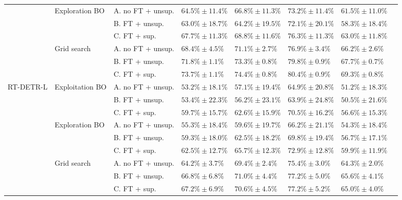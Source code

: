 \begin{table}[H]
\begin{tabular}{llllllll}
    & \multirow{3}{*}{Exploration BO} & A. no FT + unsup. & $64.5\% \pm 11.4\% $ & $66.8\% \pm 11.3\% $ & $73.2\% \pm 11.4\% $ & $61.5\% \pm 11.0\% $ \\ 
    &  & B. FT + unsup. & $63.0\% \pm 18.7\% $ & $64.2\% \pm 19.5\% $ & $72.1\% \pm 20.1\% $ & $58.3\% \pm 18.4\% $ \\ 
    &  & C. FT + sup. & $67.7\% \pm 11.3\% $ & $68.8\% \pm 11.6\% $ & $76.3\% \pm 11.3\% $ & $63.0\% \pm 11.8\% $ \\ 
    \cmidrule{2-7}
    & \multirow{3}{*}{Grid search} & A. no FT + unsup. & $68.4\% \pm 4.5\% $ & $71.1\% \pm 2.7\% $ & $76.9\% \pm 3.4\% $ & $66.2\% \pm 2.6\% $ \\ 
    &  & B. FT + unsup. & $71.8\% \pm 1.1\% $ & $73.3\% \pm 0.8\% $ & $79.8\% \pm 0.9\% $ & $67.7\% \pm 0.7\% $ \\ 
    &  & C. FT + sup. & $73.7\% \pm 1.1\% $ & $74.4\% \pm 0.8\% $ & $80.4\% \pm 0.9\% $ & $69.3\% \pm 0.8\% $ \\ 
    \midrule
    \multirow{9}{*}{RT-DETR-L} & \multirow{3}{*}{Exploitation BO} & A. no FT + unsup. & $53.2\% \pm 18.1\% $ & $57.1\% \pm 19.4\% $ & $64.9\% \pm 20.8\% $ & $51.2\% \pm 18.3\% $ \\ 
    &  & B. FT + unsup. & $53.4\% \pm 22.3\% $ & $56.2\% \pm 23.1\% $ & $63.9\% \pm 24.8\% $ & $50.5\% \pm 21.6\% $ \\ 
    &  & C. FT + sup. & $59.7\% \pm 15.7\% $ & $62.6\% \pm 15.9\% $ & $70.5\% \pm 16.2\% $ & $56.6\% \pm 15.3\% $ \\ 
    \cmidrule{2-7}
    & \multirow{3}{*}{Exploration BO} & A. no FT + unsup. & $55.3\% \pm 18.4\% $ & $59.6\% \pm 19.7\% $ & $66.2\% \pm 21.1\% $ & $54.3\% \pm 18.4\% $ \\ 
    &  & B. FT + unsup. & $59.3\% \pm 18.0\% $ & $62.5\% \pm 18.2\% $ & $69.8\% \pm 19.4\% $ & $56.7\% \pm 17.1\% $ \\ 
    &  & C. FT + sup. & $62.5\% \pm 12.7\% $ & $65.7\% \pm 12.3\% $ & $72.9\% \pm 12.8\% $ & $59.9\% \pm 11.9\% $ \\ 
    \cmidrule{2-7}
    & \multirow{3}{*}{Grid search} & A. no FT + unsup. & $64.2\% \pm 3.7\% $ & $69.4\% \pm 2.4\% $ & $75.4\% \pm 3.0\% $ & $64.3\% \pm 2.0\% $ \\ 
    &  & B. FT + unsup. & $66.8\% \pm 6.8\% $ & $71.0\% \pm 4.4\% $ & $77.2\% \pm 5.0\% $ & $65.6\% \pm 4.1\% $ \\ 
    &  & C. FT + sup. & $67.2\% \pm 6.9\% $ & $70.6\% \pm 4.5\% $ & $77.2\% \pm 5.2\% $ & $65.0\% \pm 4.0\% $ \\ 
    \midrule
    \end{tabular}%

\end{table}

